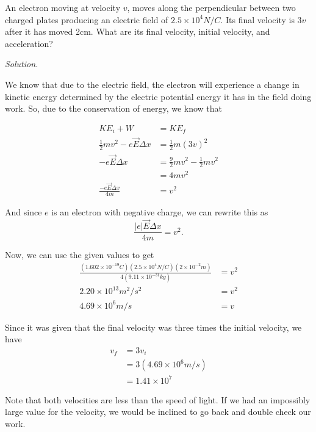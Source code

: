 \documentclass{article}
\begin{document}
	An electron moving at velocity $v$, moves along the perpendicular between two charged plates producing an electric field of $2.5 \times 10^4 N/C$. Its final velocity is $3v$ after it has moved 2cm. What are its final velocity, initial velocity, and acceleration?
	
	\textit{Solution.}
	
	We know that due to the electric field, the electron will experience a change in kinetic energy determined by the electric potential energy it has in the field doing work. So, due to the conservation of energy, we know that 
	
	\begin{equation*}
	\begin{split}
	KE_i + W & = KE_f \\
	\frac{1}{2}mv^2 - e\vec{E} \Delta x & = \frac{1}{2}m(3v)^2 \\
	-e\vec{E} \Delta x & = \frac{9}{2}mv^2 - \frac{1}{2}mv^2 \\
	& = 4mv^2 \\
	\frac{-e\vec{E}\Delta x}{4m} & = v^2
	\end{split}
	\end{equation*}
	
	And since $e$ is an electron with negative charge, we can rewrite this as
	$$ \frac{|e|\vec{E}\Delta x}{4m} = v^2 . $$
	
	Now, we can use the given values to get
		\begin{equation*}
		\begin{split}
		\frac{(1.602 \times 10^{-19}C)(2.5 \times 10^4 N/C)(2 \times 10^{-2}m)}{4(9.11 \times 10^{-31}kg)} & = v^2 \\
		2.20 \times 10^{13} m^2/s^2 & = v^2\\
		4.69 \times 10^{6} m/s & = v
		\end{split}
		\end{equation*}
		
	Since it was given that the final velocity was three times the initial velocity, we have
	\begin{equation*}
	\begin{split}
	v_f & = 3 v_i \\
	    & = 3(4.69 \times 10^{6} m/s) \\
	    & = 1.41 \times 10^{7}
	\end{split}
	\end{equation*}

	Note that both velocities are less than the speed of light. If we had an impossibly large value for the velocity, we would be inclined to go back and double check our work.
	
\end{document}
